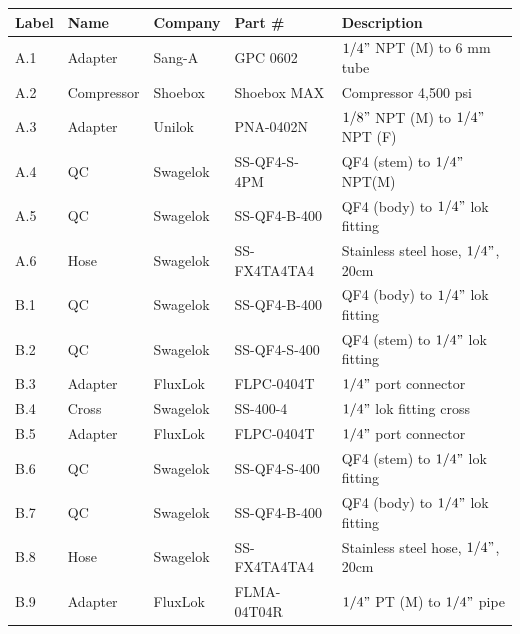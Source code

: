 \begin{table}[h!]
\footnotesize
\centering
\begin{tabular}{lllll}
\hline \hline
Label & Name        & Company  & Part \#       & Description                                                    \\ \hline \hline
A.1   & Adapter     & Sang-A   & GPC 0602       & $1/4"$ NPT (M) to 6 mm tube                                        \\
A.2   & Compressor  & Shoebox  & Shoebox MAX    & Compressor 4,500 psi                           \\
A.3   & Adapter     & Unilok   & PNA-0402N      &  $1/8"$ NPT (M) to $1/4"$ NPT (F)                                       \\
A.4   & QC          & Swagelok & SS-QF4-S-4PM   & QF4 (stem) to $1/4"$ NPT(M)                                        \\
A.5   & QC          & Swagelok & SS-QF4-B-400   & QF4 (body) to $1/4"$ lok fitting                                   \\
A.6   & Hose        & Swagelok & SS-FX4TA4TA4   & Stainless steel hose, $1/4"$, 20cm                                 \\
\hline
B.1   & QC          & Swagelok & SS-QF4-B-400   & QF4 (body) to $1/4"$ lok fitting                                   \\
B.2   & QC          & Swagelok & SS-QF4-S-400   & QF4 (stem) to $1/4"$ lok fitting                                   \\
B.3   & Adapter     & FluxLok  & FLPC-0404T     & $1/4"$ port connector                                              \\
B.4   & Cross & Swagelok & SS-400-4       & $1/4"$ lok fitting cross                                           \\
B.5   & Adapter     & FluxLok  & FLPC-0404T     & $1/4"$ port connector                                              \\
B.6   & QC          & Swagelok & SS-QF4-S-400   & QF4 (stem) to $1/4"$ lok fitting                                   \\
B.7   & QC          & Swagelok & SS-QF4-B-400   & QF4 (body) to $1/4"$ lok fitting                                   \\
B.8   & Hose        & Swagelok & SS-FX4TA4TA4   & Stainless steel hose, $1/4"$, 20cm                                 \\
B.9   & Adapter     & FluxLok  & FLMA-04T04R    & $1/4"$ PT (M) to $1/4"$ pipe                                           \\

\end{tabular}
\end{table}
